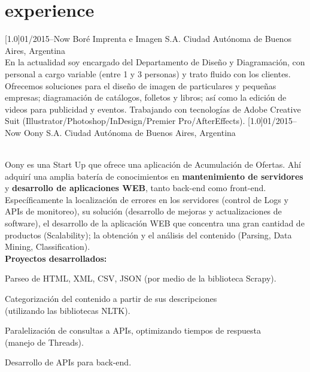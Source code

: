 \documentclass[]{cv-style}          %
\begin{document}
\section{experience}
  \vspace{-0.2cm}
\begin{entrylist}
\entry
  {\scalebox{.8}[1.0]{01/2015--Now}}
  {Boré Imprenta e Imagen S.A.}
  {Ciudad Autónoma de Buenos Aires, Argentina}
  {\\
  En la actualidad soy encargado del Departamento de Diseño y Diagramación, con personal a cargo variable (entre 1 y 3 personas) y trato fluido con los clientes. Ofrecemos soluciones para el diseño de imagen de particulares y pequeñas empresas; diagramación de catálogos, folletos y libros; así como la edición de videos para publicidad y eventos. Trabajando con tecnologías de Adobe Creative Suit (Illustrator/Photoshop/InDesign/Premier Pro/AfterEffects).}
\vspace{-0.3cm}
\entry
  {\scalebox{.8}[1.0]{01/2015--Now}}
  {Oony S.A.}
  {Ciudad Autónoma de Buenos Aires, Argentina}
  {\\
  Oony es una Start Up que ofrece una aplicación de Acumulación de Ofertas. Ahí adquirí una amplia batería de conocimientos en \textbf{mantenimiento de servidores} y \textbf{desarrollo de aplicaciones WEB}, tanto back-end como front-end. Específicamente la localización de errores en los servidores (control de Logs y APIs de monitoreo), su solución (desarrollo de mejoras y actualizaciones de software), el desarrollo de la aplicación WEB que concentra una gran cantidad de productos (Scalability); la obtención y el análisis del contenido (Parsing, Data Mining, Classification).\\
  \textbf{Proyectos desarrollados:}
  \begin{itemize}\small{
    \item Parseo de HTML, XML, CSV, JSON (por medio de la biblioteca Scrapy).
    \item Categorización del contenido a partir de sus descripciones\\
    (utilizando las bibliotecas NLTK).
    \item Paralelización de consultas a APIs, optimizando tiempos de respuesta\\
    (manejo de Threads).
    \item Desarrollo de APIs para back-end.}
  \end{itemize}}
\end{entrylist}
\end{document}
